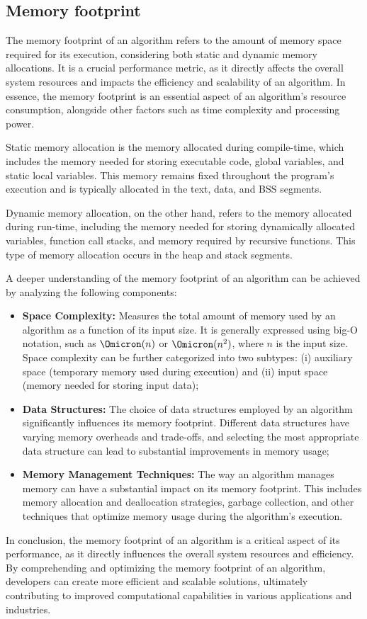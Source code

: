\subsection{Memory footprint}
\label{subsec:memory-footprint}

The memory footprint of an algorithm refers to the amount of memory space required for its execution, considering both static and dynamic memory allocations.
It is a crucial performance metric, as it directly affects the overall system resources and impacts the efficiency and scalability of an algorithm.
In essence, the memory footprint is an essential aspect of an algorithm's resource consumption, alongside other factors such as time complexity and processing power.

Static memory allocation is the memory allocated during compile-time, which includes the memory needed for storing executable code, global variables, and static local variables.
This memory remains fixed throughout the program's execution and is typically allocated in the text, data, and \ac{BSS} segments.

Dynamic memory allocation, on the other hand, refers to the memory allocated during run-time, including the memory needed for storing dynamically allocated variables, function call stacks, and memory required by recursive functions.
This type of memory allocation occurs in the heap and stack segments.

A deeper understanding of the memory footprint of an algorithm can be achieved by analyzing the following components:

\begin{itemize}
    \item \textbf{Space Complexity:} Measures the total amount of memory used by an algorithm as a function of its input size.
        It is generally expressed using big-O notation, such as $\Omicron(n)$ or $\Omicron(n^2)$, where $n$ is the input size.
        Space complexity can be further categorized into two subtypes:
        (i) auxiliary space (temporary memory used during execution) and
        (ii) input space (memory needed for storing input data);
    \item \textbf{Data Structures:} The choice of data structures employed by an algorithm significantly influences its memory footprint.
        Different data structures have varying memory overheads and trade-offs, and selecting the most appropriate data structure can lead to substantial improvements in memory usage;
    \item \textbf{Memory Management Techniques:} The way an algorithm manages memory can have a substantial impact on its memory footprint.
        This includes memory allocation and deallocation strategies, garbage collection, and other techniques that optimize memory usage during the algorithm's execution.
\end{itemize}

In conclusion, the memory footprint of an algorithm is a critical aspect of its performance, as it directly influences the overall system resources and efficiency.
By comprehending and optimizing the memory footprint of an algorithm, developers can create more efficient and scalable solutions, ultimately contributing to improved computational capabilities in various applications and industries.
